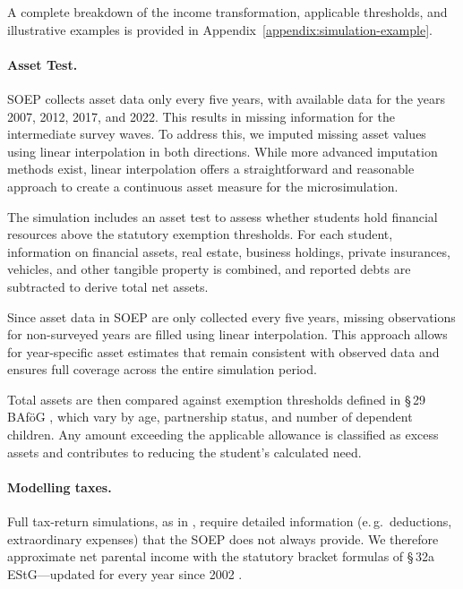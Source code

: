 A complete breakdown of the income transformation, applicable thresholds, and illustrative examples is provided in Appendix~\ref{appendix:simulation-example}.

\paragraph{Asset Test.}
SOEP collects asset data only every five years, with available data for the years 2007, 2012, 2017, and 2022. 
This results in missing information for the intermediate survey waves. 
To address this, we imputed missing asset values using linear interpolation in both directions. 
While more advanced imputation methods exist, linear interpolation offers a straightforward and reasonable approach to create a continuous asset measure for the microsimulation.

The simulation includes an asset test to assess whether students hold financial resources above the statutory exemption thresholds. 
For each student, information on financial assets, real estate, business holdings, private insurances, vehicles, and other tangible property is combined, and reported debts are subtracted to derive total net assets.

Since asset data in SOEP are only collected every five years, missing observations for non-surveyed years are filled using linear interpolation. 
This approach allows for year-specific asset estimates that remain consistent with observed data and ensures full coverage across the entire simulation period.

Total assets are then compared against exemption thresholds defined in §\,29 BAföG \citep{bafoeg_law}, which vary by age, partnership status, and number of dependent children. 
Any amount exceeding the applicable allowance is classified as excess assets and contributes to reducing the student's calculated need. 

\paragraph{Modelling taxes.}
Full tax‑return simulations, as in \cite{herber_non-take-up_2019}, require detailed information (e.\,g.\ deductions, extraordinary expenses) that the SOEP does not always provide.  
We therefore approximate net parental income with the statutory bracket formulas of §\,32a EStG—updated for every year since 2002 \citep{estg_law,estg_2025,estg_2024,estg_2023,estg_2022,estg_2021,estg_2020,estg_2019,estg_2018,estg_2017,estg_2016,estg_2015,estg_2014,estg_2013,estg_2012,estg_2007,estg_2006,estg_lohninfo_2012}.  

